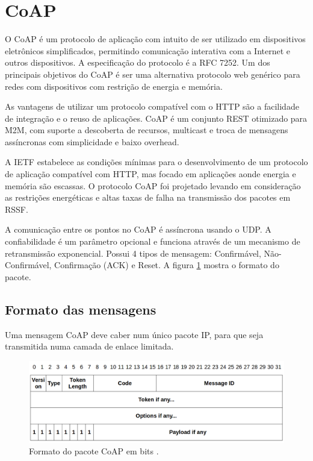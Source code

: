 
\section{CoAP}

O CoAP \'e um protocolo de aplica\c{c}\~ao com intuito de ser utilizado em dispositivos eletr\^onicos simplificados, permitindo comunica\c{c}\~ao interativa com a Internet e outros dispositivos. A especifica\c{c}\~ao do protocolo \'e a RFC 7252. Um dos principais objetivos do CoAP \'e ser uma alternativa protocolo web gen\'erico para redes com dispositivos com restri\c{c}\~ao de energia e mem\'oria.

As vantagens de utilizar um protocolo compat\'ivel com o HTTP s\~ao a facilidade de integra\c{c}\~ao e o reuso de aplica\c{c}\~oes. CoAP \'e um conjunto REST otimizado para M2M, com suporte a descoberta de recursos, multicast e troca de mensagens ass\'incronas com simplicidade e baixo overhead.

A IETF estabelece as condi\c{c}\~oes m\'inimas para o desenvolvimento de um protocolo de aplica\c{c}\~ao compat\'ivel com HTTP, mas focado em aplica\c{c}\~oes aonde energia e mem\'oria s\~ao escassas. O protocolo CoAP foi projetado levando em considera\c{c}\~ao as restri\c{c}\~oes energ\'eticas e altas taxas de falha na transmiss\~ao dos pacotes em RSSF.

A comunica\c{c}\~ao entre os pontos no CoAP \'e ass\'incrona usando o UDP. A confiabilidade \'e um par\^ametro opcional e funciona atrav\'es de um mecanismo de retransmiss\~ao exponencial. Possui 4 tipos de mensagem: Confirm\'avel, N\~ao-Confirm\'avel, Confirma\c{c}\~ao (ACK) e Reset. A figura \ref{coapFormat} mostra o formato do pacote.

\subsection{Formato das mensagens}
Uma mensagem CoAP deve caber num \'unico pacote IP, para que seja transmitida numa camada de enlace limitada.
\begin{figure}[H]
    \label{coapFormat}
    \centering
    \includegraphics[width=1.0\textwidth]{figuras/formato.png}
    \caption{Formato do pacote CoAP  em bits \cite{draft-ietf-core-coap-18}.}
\end{figure}


